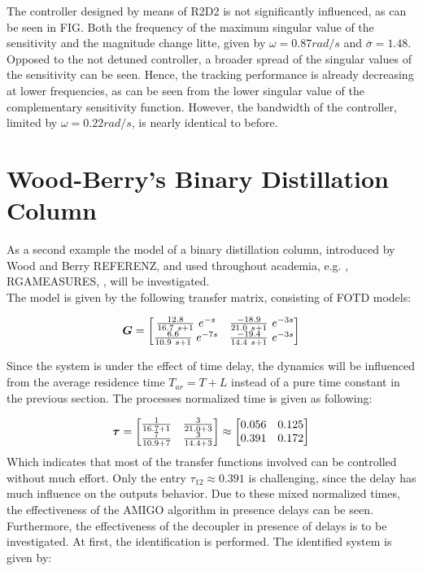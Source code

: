 The controller designed by means of R2D2 is not significantly influenced, as can be seen in FIG. Both the frequency of the maximum singular value of the sensitivity and the magnitude change litte, given by $\omega = 0.87 rad/s$ and $\overline{\sigma} = 1.48$. Opposed to the not detuned controller, a broader spread of the singular values of the sensitivity can be seen. Hence, the tracking performance is already decreasing at lower frequencies, as can be seen from the lower singular value of the complementary sensitivity function. However, the bandwidth of the controller, limited by $\omega = 0.22 rad/s$, is nearly identical to before.\\

\newpage
\section{Wood-Berry's Binary Distillation Column}%
\label{c:fotd:s:woodberry}

As a second example the model of a binary distillation column, introduced by Wood and Berry REFERENZ, and used throughout academia, e.g. \cite{Astrom2001a}, RGAMEASURES, \cite{Skogestad2005}, will be investigated.\\

The model is given by the following transfer matrix, consisting of FOTD models:

\begin{align*}
\mbox{\boldmath$G$} = \begin{bmatrix}
\frac{12.8}{16.7 ~s+1}~e^{-s}  & \frac{-18.9}{21.0 ~s+1}~e^{-3s}\\
\frac{6.6}{10.9 ~s+1}~e^{-7s} & \frac{-19.4}{14.4 ~s+1}~e^{-3s}
\end{bmatrix}
\end{align*} 

Since the system is under the effect of time delay, the dynamics will be influenced from the average residence time $T_{ar} = T + L$ instead of a pure time constant in the previous section. The processes normalized time is given as following:

\begin{align*}
\mbox{\boldmath$\tau$} = \begin{bmatrix}
\frac{1}{16.7+1} & \frac{3}{21.0+3} \\
\frac{7}{10.9+7} & \frac{3}{14.4+3}
\end{bmatrix} \approx \begin{bmatrix} 
0.056 & 0.125 \\
0.391 & 0.172
\end{bmatrix}
\end{align*}
Which indicates that most of the transfer functions involved can be controlled without much effort. Only the entry $\tau_{12} \approx 0.391$ is challenging, since the delay has much influence on the outputs behavior. Due to these mixed normalized times, the effectiveness of the AMIGO algorithm in presence delays can be seen. Furthermore, the effectiveness of the decoupler in presence of delays is to be investigated. At first, the identification is performed. The identified system is given by:

